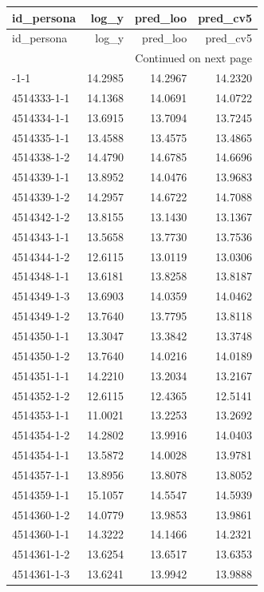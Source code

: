 \begin{longtable}{lrrr}
\toprule
id\_persona & log\_y & pred\_loo & pred\_cv5 \\
\midrule
\endfirsthead
\toprule
id\_persona & log\_y & pred\_loo & pred\_cv5 \\
\midrule
\endhead
\midrule
\multicolumn{4}{r}{Continued on next page} \\
\midrule
\endfoot
\bottomrule
\endlastfoot
4514331-1-1 & 14.2985 & 14.2967 & 14.2320 \\
4514333-1-1 & 14.1368 & 14.0691 & 14.0722 \\
4514334-1-1 & 13.6915 & 13.7094 & 13.7245 \\
4514335-1-1 & 13.4588 & 13.4575 & 13.4865 \\
4514338-1-2 & 14.4790 & 14.6785 & 14.6696 \\
4514339-1-1 & 13.8952 & 14.0476 & 13.9683 \\
4514339-1-2 & 14.2957 & 14.6722 & 14.7088 \\
4514342-1-2 & 13.8155 & 13.1430 & 13.1367 \\
4514343-1-1 & 13.5658 & 13.7730 & 13.7536 \\
4514344-1-2 & 12.6115 & 13.0119 & 13.0306 \\
4514348-1-1 & 13.6181 & 13.8258 & 13.8187 \\
4514349-1-3 & 13.6903 & 14.0359 & 14.0462 \\
4514349-1-2 & 13.7640 & 13.7795 & 13.8118 \\
4514350-1-1 & 13.3047 & 13.3842 & 13.3748 \\
4514350-1-2 & 13.7640 & 14.0216 & 14.0189 \\
4514351-1-1 & 14.2210 & 13.2034 & 13.2167 \\
4514352-1-2 & 12.6115 & 12.4365 & 12.5141 \\
4514353-1-1 & 11.0021 & 13.2253 & 13.2692 \\
4514354-1-2 & 14.2802 & 13.9916 & 14.0403 \\
4514354-1-1 & 13.5872 & 14.0028 & 13.9781 \\
4514357-1-1 & 13.8956 & 13.8078 & 13.8052 \\
4514359-1-1 & 15.1057 & 14.5547 & 14.5939 \\
4514360-1-2 & 14.0779 & 13.9853 & 13.9861 \\
4514360-1-1 & 14.3222 & 14.1466 & 14.2321 \\
4514361-1-2 & 13.6254 & 13.6517 & 13.6353 \\
4514361-1-3 & 13.6241 & 13.9942 & 13.9888 \\

\end{longtable}

